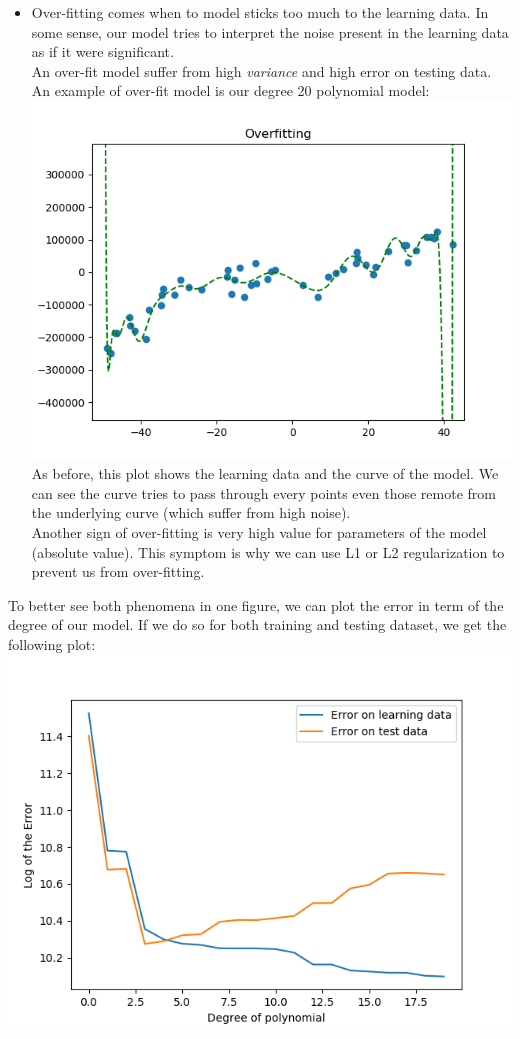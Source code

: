 \documentclass[a4paper, 10pt]{article}
\begin{document}
\begin{itemize}[label=$\square$]
    \item Over-fitting comes when to model sticks too much to the learning data. In some sense, 
    our model tries to interpret the noise present in the learning data as if it were significant.
    \\
    An over-fit model suffer from high \emph{variance} and high error on testing data.
    \\
    An example of over-fit model is our degree 20 polynomial model:
    \\
    \includegraphics{ex1a_over}
    \\
    As before, this plot shows the learning data and the curve of the model.
    We can see the curve tries to pass through every points even those remote from the underlying
    curve (which suffer from high noise).
    \\ 
    Another sign of over-fitting is very high value for parameters of the model (absolute value). 
    This symptom is why we can use L1 or L2 regularization to prevent us from over-fitting.
\end{itemize}
To better see both phenomena in one figure, we can plot the error in term of the degree of our model.
If we do so for both training and testing dataset, we get the following plot:
\\
\includegraphics{ex1a_error}
\end{document}
